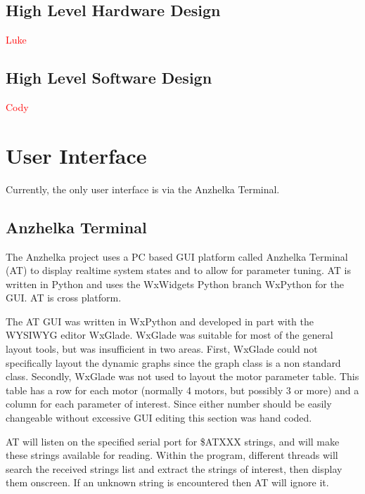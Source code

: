 \documentclass{article}
\numberwithin{equation}{section} %
\begin{document}

\subsection{High Level Hardware Design}
\textcolor{red}{Luke}



\subsection{High Level Software Design}
\textcolor{red}{Cody}

 
\section{User Interface}
Currently, the only user interface is via the Anzhelka Terminal.
\subsection{Anzhelka Terminal}
The Anzhelka project uses a PC based GUI platform called Anzhelka Terminal (AT) to display realtime system states and to allow for parameter tuning. AT is written in Python and uses the WxWidgets Python branch WxPython for the GUI. AT is cross platform.

The AT GUI was written in WxPython and developed in part with the WYSIWYG editor WxGlade. WxGlade was suitable for most of the general layout tools, but was insufficient in two areas. First, WxGlade could not specifically layout the dynamic graphs since the graph class is a non standard class. Secondly, WxGlade was not used to layout the motor parameter table. This table has a row for each motor (normally 4 motors, but possibly 3 or more) and a column for each parameter of interest. Since either number should be easily changeable without excessive GUI editing this section was hand coded.

AT will listen on the specified serial port for \$ATXXX strings, and will  make these strings available for reading. Within the program, different threads will search the received strings list and extract the strings of interest, then display them onscreen. If an unknown string is encountered then AT will ignore it.
\end{document}
